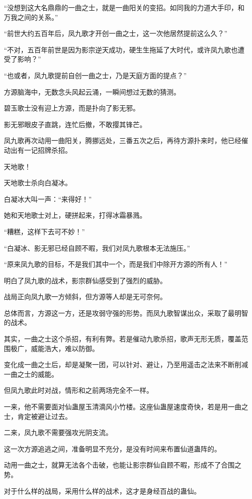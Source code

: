\begin{this_body}
“没想到这大名鼎鼎的一曲之士，就是一曲阳关的变招。如同我的力道大手印，和万我之间的关系。”

“前世大约五百年后，凤九歌才开创一曲之士，这一次他居然提前这么久？”

“不对，五百年前世是因为影宗逆天成功，硬生生拖延了大时代，或许凤九歌也遭受了影响？”

“也或者，凤九歌提前自创一曲之士，乃是天庭方面的提点？”

方源脑海中，无数念头风起云涌，一瞬间想过无数的猜测。

碧玉歌士没有迎上方源，而是扑向了影无邪。

影无邪眼皮子直跳，连忙后撤，不敢撄其锋芒。

凤九歌再次动用一曲阳关，腾挪远处，三番五次之后，再待方源扑来时，他已经催动出有一记招牌杀招。

天地歌！

天地歌士杀向白凝冰。

白凝冰大叫一声：“来得好！”

她和天地歌士对上，硬拼起来，打得冰霜暴溅。

“糟糕，这样下去可不妙！”

“白凝冰、影无邪已经自顾不暇，我们对凤九歌根本无法施压。”

“原来凤九歌的目标，不是我们其中一个，而是我们中除开方源的所有人！”

明白了凤九歌的战术，影宗群仙感受到了强烈的威胁。

战局正向凤九歌一方倾斜，但方源等人却是无可奈何。

总体而言，方源这一方，还是攻弱守强的形势。而凤九歌智谋出众，采取了最明智的战术。

其实，一曲之士这个杀招，有利有弊。若是催动九歌杀招，歌声无形无质，覆盖范围极广，威能浩大，难以防御。

变化成一曲之士后，却是凝聚一团，可以针对、避让，乃至用遥击之法来不断削减一曲之士的威能。

但凤九歌此时对战，情形和之前两场完全不一样。

一来，他不需要面对仙蛊屋玉清滴风小竹楼。这座仙蛊屋速度奇快，若是用一曲之士，肯定被避让过去。

二来，凤九歌不需要强攻光阴支流。

这一次方源追逃之间，准备明显不充分，是没有时间来布置仙道蛊阵的。

动用一曲之士，就算无法各个击破，也能让影宗群仙自顾不暇，形成不了合围之势。

对于什么样的战局，采用什么样的战术，这才是身经百战的蛊仙。


\end{this_body}
